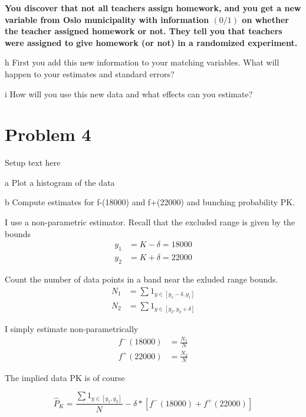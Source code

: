 \documentclass{article}
\begin{document}
\textbf{You discover that not all teachers assign homework, and you get a new variable from Oslo municipality with information $(0 / 1)$ on whether the teacher assigned homework or not. They tell you that teachers were assigned to give homework (or not) in a randomized experiment.}
\begin{problem}{h}
First you add this new information to your matching variables. What will happen to your estimates and standard errors?
\end{problem}
\begin{solution}
\end{solution}


\begin{problem}{i}
How will you use this new data and what effects can you estimate?
\end{problem}
\begin{solution}
\end{solution}


\newpage
\section*{Problem 4}
Setup text here

\begin{problem}{a}
Plot a histogram of the data
\end{problem}
\begin{solution}
\end{solution}

\begin{problem}{b}
Compute estimates for f-(18000) and f+(22000) and bunching probability PK.
\end{problem}
\begin{solution}
I use a non-parametric estimator. Recall that the excluded range is given by the bounds
\begin{align*}
    y_1 &= K - \delta = 18000 \\
    y_2 &= K + \delta = 22000
\end{align*}

Count the number of data points in a band near the exluded range bounds. 
\begin{align*}
    N_1 &= \sum 1_{y\in [y_1-\delta, y_1]} \\
    N_2 &= \sum 1_{y\in [y_2, y_2+\delta]}
\end{align*}

I simply estimate non-parametrically 
\begin{align*}
    f^-(18000) &= \frac{N_1}{N} \\
    f^+(22000) &= \frac{N_2}{N}
\end{align*}

The implied data PK is of course

$$
\widehat{P}_K = \frac{\sum 1_{y\in [y_1, y_2]}}{N} - \delta * [f^-(18000) + f^+(22000)]
$$
\end{solution}
\end{document}
